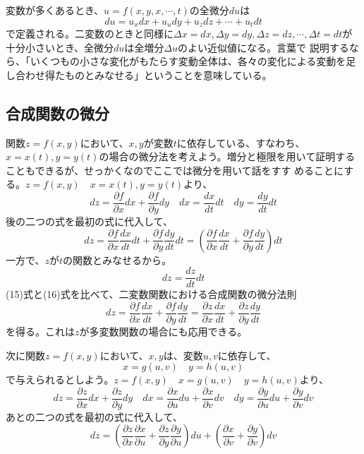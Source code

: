 \documentclass[a4j,dvipdfmx]{jsarticle}
\begin{document}
変数が多くあるとき、$u=f(x,y,x,\cdots,t)$の全微分$du$は
\begin{equation}
    du=u_xdx+u_udy+u_zdz+\cdots+u_tdt
\end{equation}
で定義される。二変数のときと同様に$\Delta x=dx,\Delta y=dy,\Delta z=dz,\cdots,\Delta t=dt$が十分小さいとき、全微分$du$は全増分$\Delta u$のよい近似値になる。言葉で
説明するなら、「いくつもの小さな変化がもたらす変動全体は、各々の変化による変動を足し合わせ得たものとみなせる」ということを意味している。
\subsection{合成関数の微分}
関数$z=f(x,y)$において、$x,y$が変数$t$に依存している、すなわち、$x=x(t),y=y(t)$の場合の微分法を考えよう。増分と極限を用いて証明することもできるが、せっかくなのでここでは微分を用いて話をすす
めることにする。$z=f(x,y)\quad x=x(t),y=y(t)$より、
\begin{equation}
    dz=\frac{\partial f}{\partial x}dx+\frac{\partial f}{\partial y}dy\quad dx=\frac{dx}{dt}dt\quad dy=\frac{dy}{dt}dt
\end{equation}
後の二つの式を最初の式に代入して、
\begin{equation}
    dz=\frac{\partial f}{\partial x}\frac{dx}{dt}dt+\frac{\partial f}{\partial y}\frac{dy}{dt}dt
    =\left(\frac{\partial f}{\partial x}\frac{dx}{dt}+\frac{\partial f}{\partial y}\frac{dy}{dt}\right)dt
\end{equation}
一方で、$z$が$t$の関数とみなせるから。
\begin{equation}
    dz=\frac{dz}{dt}dt
\end{equation}
(15)式と(16)式を比べて、二変数関数における合成関数の微分法則
\begin{equation}
    dz=\frac{\partial f}{\partial x}\frac{dx}{dt}+\frac{\partial f}{\partial y}\frac{dy}{dt}
    =\frac{\partial z}{\partial x}\frac{dx}{dt}+\frac{\partial z}{\partial y}\frac{dy}{dt}
\end{equation}
を得る。これは$z$が多変数関数の場合にも応用できる。

次に関数$z=f(x,y)$において、$x,y$は、変数$u,v$に依存して、
\begin{equation}
    x=g(u,v)\quad y=h(u,v)
\end{equation}
で与えられるとしよう。$z=f(x,y)\quad x=g(u,v)\quad y=h(u,v)$より、
\begin{equation}
    dz=\frac{\partial z}{\partial x}dx+\frac{\partial z}{\partial y}dy\quad dx=\frac{\partial x}{\partial u}du+\frac{\partial x}{\partial v}dv\quad dy=\frac{\partial y}{\partial u}du+\frac{\partial y}{\partial v}dv
\end{equation}
あとの二つの式を最初の式に代入して、
\begin{equation}
    dz=\left(\frac{\partial z}{\partial x}\frac{\partial x}{\partial u}+\frac{\partial z}{\partial y}\frac{\partial y}{\partial u}\right)du+\left(\frac{\partial x}{\partial v}+\frac{\partial y}{\partial v}\right)dv
\end{equation}
\end{document}
